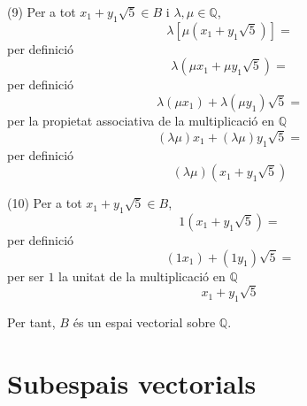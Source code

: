 \begin{solucio}
(9) Per a tot $x_{1}+y_{1}\sqrt{5}\in B$ i $\lambda ,\mu \in \mathbb{Q}$,
\begin{equation*}
\lambda \left[ \mu \left( x_{1}+y_{1}\sqrt{5}\right) \right] =
\end{equation*}%
per definició%
\begin{equation*}
\lambda \left( \mu x_{1}+\mu y_{1}\sqrt{5}\right) =
\end{equation*}%
per definició%
\begin{equation*}
\lambda \left( \mu x_{1}\right) +\lambda \left( \mu y_{1}\right) \sqrt{5}=
\end{equation*}%
per la propietat associativa de la multiplicació en $\mathbb{Q}$%
\begin{equation*}
\left( \lambda \mu \right) x_{1}+\left( \lambda \mu \right) y_{1}\sqrt{5}=
\end{equation*}%
per definició%
\begin{equation*}
\left( \lambda \mu \right) \left( x_{1}+y_{1}\sqrt{5}\right)
\end{equation*}

(10) Per a tot $x_{1}+y_{1}\sqrt{5}\in B$,
\begin{equation*}
1\left( x_{1}+y_{1}\sqrt{5}\right) =
\end{equation*}%
per definició%
\begin{equation*}
\left( 1x_{1}\right) +\left( 1y_{1}\right) \sqrt{5}=
\end{equation*}%
per ser $1$ la unitat de la multiplicació en $\mathbb{Q}$%
\begin{equation*}
x_{1}+y_{1}\sqrt{5}
\end{equation*}

Per tant, $B$ és un espai vectorial sobre $\mathbb{Q}$.
\end{solucio}

\section{Subespais vectorials}

